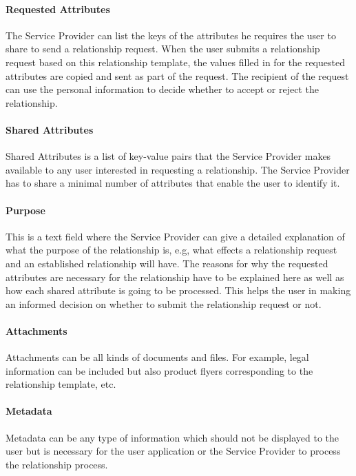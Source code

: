 \paragraph{Requested Attributes} The Service Provider can list the keys of the attributes he requires the user to share to send a relationship request. When the user submits a relationship request based on this relationship template, the values filled in for the requested attributes are copied and sent as part of the request. The recipient of the request can use the personal information to decide whether to accept or reject the relationship.
    
\paragraph{Shared Attributes} Shared Attributes is a list of key-value pairs that the Service Provider makes available to any user interested in requesting a relationship. The Service Provider has to share a minimal number of attributes that enable the user to identify it. 
    
\paragraph{Purpose} This is a text field where the Service Provider can give a detailed explanation of what the purpose of the relationship is, e.g, what effects a relationship request and an established relationship will have. The reasons for why the requested attributes are necessary for the relationship have to be explained here as well as how each shared attribute is going to be processed. This helps the user in making an informed decision on whether to submit the relationship request or not.
    
\paragraph{Attachments} Attachments can be all kinds of documents and files. For example, legal information can be included but also product flyers corresponding to the relationship template, etc.
    
\paragraph{Metadata} Metadata can be any type of information which should not be displayed to the user but is necessary for the user application or the Service Provider to process the relationship process.

